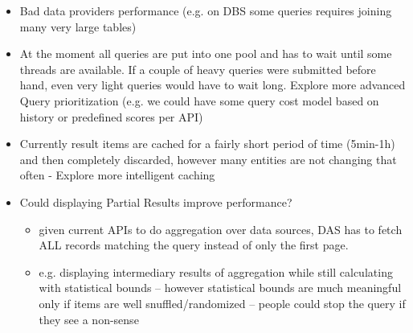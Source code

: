\documentclass[a4paper,11pt,draft]{article}
\begin{document}
\begin{itemize}
						\item Bad data providers performance (e.g. on DBS some queries requires joining many very large tables)
	     				\item At the moment all queries are put into one pool and has to wait until some threads are available. If a couple of heavy queries were submitted before hand, even very light queries would have to wait long. Explore more advanced Query prioritization 
	     					(e.g. we could have some query cost model based on history or predefined scores per API)
	     					
                		\item Currently result items are cached for a fairly short period of time (5min-1h) and then completely discarded, however many entities are not changing that often - Explore more intelligent caching
	                	  
	                		

					\item Could displaying Partial Results improve performance?
					\begin{itemize}
					     \item given current APIs to do aggregation over data sources, DAS has to fetch ALL records matching the query instead of only the first page.
                        \item 
                        \begin{small}
                        {\color{red}e.g. displaying intermediary results of aggregation while still calculating with statistical bounds -- however statistical bounds are much meaningful only if items are well snuffled/randomized -- people could stop the query if they see a non-sense}
                        \end{small}
                        
                        
					\end{itemize}

                        
\end{itemize}
\end{document}

